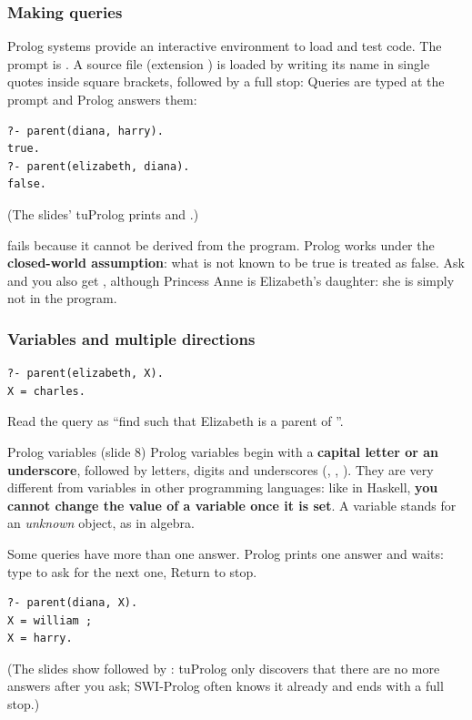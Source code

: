 \subsubsection{Making queries}

Prolog systems provide an interactive environment to load and test code. The prompt is
. A source file (extension ) is loaded by writing its name in single
quotes inside square brackets, followed by a full stop:  Queries are
typed at the prompt and Prolog answers them:
\begin{verbatim}
?- parent(diana, harry).
true.
?- parent(elizabeth, diana).
false.
\end{verbatim}
(The slides' tuProlog prints  and .)

\begin{nbwarning}
 fails because it cannot be derived from the program. Prolog
works under the \textbf{closed-world assumption}: what is not known to be true is treated
as false. Ask  and you also get , although
Princess Anne is Elizabeth's daughter: she is simply not in the program.
\end{nbwarning}

\subsubsection{Variables and multiple directions}

\begin{verbatim}
?- parent(elizabeth, X).
X = charles.
\end{verbatim}
Read the query as ``find  such that Elizabeth is a parent of ''.

\begin{nbdef}{Prolog variables (slide 8)}
Prolog variables begin with a \textbf{capital letter or an underscore}, followed by letters,
digits and underscores (, , ). They are very different from
variables in other programming languages: like in Haskell, \textbf{you cannot change the value
of a variable once it is set}. A variable stands for an \emph{unknown} object, as in algebra.
\end{nbdef}

Some queries have more than one answer. Prolog prints one answer and waits: type \code{;}
to ask for the next one, Return to stop.
\begin{verbatim}
?- parent(diana, X).
X = william ;
X = harry.
\end{verbatim}
(The slides show  followed by : tuProlog only discovers that
there are no more answers after you ask; SWI-Prolog often knows it already and ends with a
full stop.)

